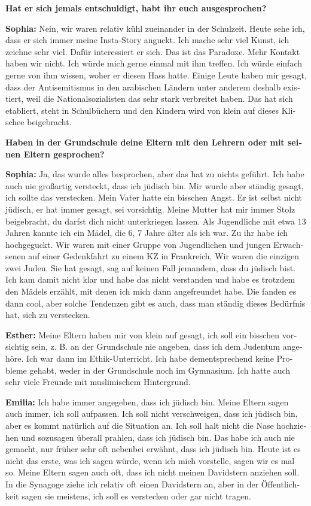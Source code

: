 \begin{otherlanguage}{ngerman}
\textbf{Hat er sich jemals entschuldigt, habt ihr euch ausgesprochen?}

\textbf{Sophia:} Nein, wir waren relativ kühl zueinander in der Schulzeit. Heute sehe ich, dass er sich immer meine Insta-Story anguckt. Ich mache sehr viel Kunst, ich zeichne sehr viel. Dafür interessiert er sich. Das ist das Paradoxe. Mehr Kontakt haben wir nicht. Ich würde mich gerne einmal mit ihm treffen. Ich würde einfach gerne von ihm wissen, woher er diesen Hass hatte. Einige Leute haben mir gesagt, dass der Antisemitismus in den arabischen Ländern unter anderem deshalb existiert, weil die Nationalsozialisten das sehr stark verbreitet haben. Das hat sich etabliert, steht in Schulbüchern und den Kindern wird von klein auf dieses Klischee beigebracht.   

\textbf{Haben in der Grundschule deine Eltern mit den Lehrern oder mit seinen Eltern gesprochen?}   

\textbf{Sophia:} Ja, das wurde alles besprochen, aber das hat zu nichts geführt. Ich habe auch nie großartig versteckt, dass ich jüdisch bin. Mir wurde aber ständig gesagt, ich sollte das verstecken. Mein Vater hatte ein bisschen Angst. Er ist selbst nicht jüdisch, er hat immer gesagt, sei vorsichtig. Meine Mutter hat mir immer Stolz beigebracht, du darfst dich nicht unterkriegen lassen. Als Jugendliche mit etwa 13 Jahren kannte ich ein Mädel, die 6, 7 Jahre älter als ich war. Zu ihr habe ich hochgeguckt. Wir waren mit einer Gruppe von Jugendlichen und jungen Erwachsenen auf einer Gedenkfahrt zu einem KZ in Frankreich. Wir waren die einzigen zwei Juden. Sie hat gesagt, sag auf keinen Fall jemandem, dass du jüdisch bist. Ich kam damit nicht klar und habe das nicht verstanden und habe es trotzdem den Mädels erzählt, mit denen ich mich dann angefreundet habe. Die fanden es dann cool, aber solche Tendenzen gibt es auch, dass man ständig dieses Bedürfnis hat, sich zu verstecken.  

\textbf{Esther:} Meine Eltern haben mir von klein auf gesagt, ich soll ein bisschen vorsichtig sein, z. B. an der Grundschule nie angeben, dass ich dem Judentum angehöre. Ich war dann im Ethik-Unterricht. Ich habe dementsprechend keine Probleme gehabt, weder in der Grundschule noch im Gymnasium. Ich hatte auch sehr viele Freunde mit muslimischem Hintergrund. 

\textbf{Emilia:} Ich habe immer angegeben, dass ich jüdisch bin. Meine Eltern sagen auch immer, ich soll aufpassen. Ich soll nicht verschweigen, dass ich jüdisch bin, aber es kommt natürlich auf die Situation an. Ich soll halt nicht die Nase hochziehen und sozusagen überall prahlen, dass ich jüdisch bin. Das habe ich auch nie gemacht, nur früher sehr oft nebenbei erwähnt, dass ich jüdisch bin. Heute ist es nicht das erste, was ich sagen würde, wenn ich mich vorstelle, sagen wir es mal so. Meine Eltern sagen auch oft, dass ich nicht meinen Davidstern anziehen soll. In die Synagoge ziehe ich relativ oft einen Davidstern an, aber in der Öffentlichkeit sagen sie meistens, ich soll es verstecken oder gar nicht tragen.  


\end{otherlanguage}
